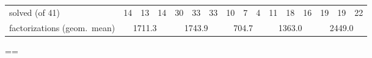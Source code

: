 {\begin{longtable}{lrrrrrrrrrrrrrrrrr}
\midrule
\multicolumn{3}{l}{solved (of 41)} & 14 & 13 & 14 & 30 & 33 & 33 & 10 & 7 & 4 & 11 & 18 & 16 & 19 & 19 & 22 \\
\multicolumn{3}{l}{factorizations (geom.\ mean)} & \multicolumn{3}{c}{1711.3} & \multicolumn{3}{c}{1743.9} & \multicolumn{3}{c}{704.7} & \multicolumn{3}{c}{1363.0} & \multicolumn{3}{c}{2449.0} \\
\end{longtable}}
\clearpage
\pdfpagewidth=\paperwidth \pdfpageheight=\paperheight
\restoregeometry
